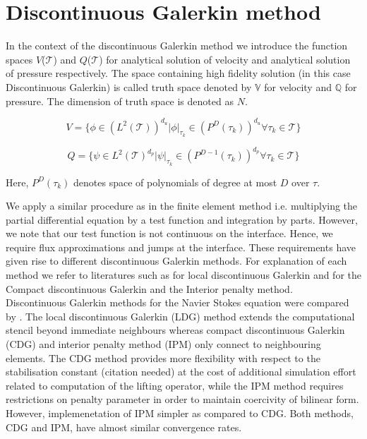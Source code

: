 \documentclass[a4paper,12pt]{book}
\begin{document}
\section{Discontinuous Galerkin method}

In the context of the discontinuous Galerkin method we introduce the function spaces $V$($\mathcal{T}$) and $Q$($\mathcal{T}$) for analytical solution of velocity and analytical solution of pressure respectively. The space containing high fidelity solution (in this case Discontinuous Galerkin) is called truth space denoted by $\mathbb{V}$ for velocity and $\mathbb{Q}$ for pressure. The dimension of truth space is denoted as $N$. 

\begin{equation} \label{velocity_test}
V = \lbrace \phi \in (L^2(\mathcal{T}))^{d_u}| \phi |_{\tau_k} \in (P^D(\tau_k))^{d_u} \forall {\tau_k} \in \mathcal{T} \rbrace
\end{equation}

\begin{equation} \label{pressure_test}
Q = \lbrace \psi \in L^2(\mathcal{T})^{d_p}| \psi |_{\tau_k} \in (P^{D-1}(\tau_k))^{d_p} \forall {\tau_k} \in \mathcal{T} \rbrace
\end{equation}

Here, $P^D(\tau_k)$ denotes space of polynomials of degree at most $D$ over $\tau$.

We apply a similar procedure as in the finite element method i.e. multiplying the partial differential equation by a test function and integration by parts. However, we note that our test function is not continuous on the interface. Hence, we require flux approximations and jumps at the interface. These requirements have given rise to different discontinuous Galerkin methods. For explanation of each method we refer to literatures such as \cite{persson} for local discontinuous Galerkin and \cite{Montlaur} for the Compact discontinuous Galerkin and the Interior penalty method. \\

Discontinuous Galerkin methods for the Navier Stokes equation were compared by \cite{Montlaur}. The local discontinuous Galerkin (LDG) method extends the computational stencil beyond immediate neighbours whereas compact discontinuous Galerkin (CDG) and interior penalty method (IPM) only connect to neighbouring elements. The CDG method provides more flexibility with respect to the stabilisation constant (citation needed) at the cost of additional simulation effort related to computation of the lifting operator, while the IPM method requires restrictions on penalty parameter in order to maintain coercivity of bilinear form. However, implemenetation of IPM simpler as compared to CDG. Both methods, CDG and IPM, have almost similar convergence rates. 
\end{document}
